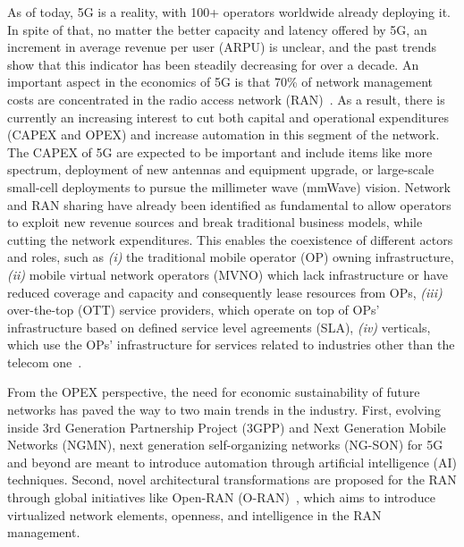 \documentclass[journal]{IEEEtran}
\begin{document}
As of today, 5G is a reality, with 100+ operators worldwide already deploying it. In spite of that, no matter the better capacity and latency offered by 5G, an increment in average revenue per user (ARPU) is unclear, and the past trends show that this indicator has been steadily decreasing for over a decade. An important aspect in the economics of 5G is that 70\% of network management costs are concentrated in the radio access network (RAN)~\cite{ORAN2}. As a result, there is currently an increasing interest to cut both capital and operational expenditures (CAPEX and OPEX) and increase automation in this segment of the network. The CAPEX of 5G are expected to be important and include items like more spectrum, deployment of new antennas and equipment upgrade, or large-scale small-cell deployments to pursue the millimeter wave (mmWave) vision. Network and RAN sharing have already been identified as fundamental to allow operators to exploit new revenue sources and break traditional business models, while cutting the network expenditures. This enables the coexistence of different actors and roles, such as \textit{(i)} the traditional mobile operator (OP) owning infrastructure, \textit{(ii)} mobile virtual network operators (MVNO) which lack infrastructure or have reduced coverage and capacity and consequently lease resources from OPs, \textit{(iii)} over-the-top (OTT) service providers, which operate on top of OPs' infrastructure based on defined service level agreements (SLA), \textit{(iv)} verticals, which use the OPs' infrastructure for services related to industries other than the telecom one~\cite{samdanis2016network}.

From the OPEX perspective, the need for economic sustainability of future networks has paved the way to two main trends in the industry. First, evolving inside 3rd Generation Partnership Project (3GPP) and Next Generation Mobile Networks (NGMN), next generation self-organizing networks (NG-SON) for 5G and beyond are meant to introduce automation through artificial intelligence (AI) techniques. Second, novel architectural transformations are proposed for the RAN through global initiatives like Open-RAN (O-RAN)~\cite{ORAN2}, which aims to introduce virtualized network elements, openness, and intelligence in the RAN management. 
\end{document}
